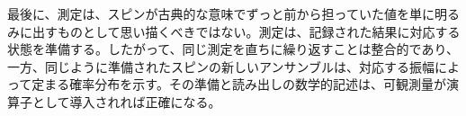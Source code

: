 \begin{classroomqa}
\end{classroomqa}

最後に、測定は、スピンが古典的な意味でずっと前から担っていた値を単に明るみに出すものとして思い描くべきではない。測定は、記録された結果に対応する状態を準備する。したがって、同じ測定を直ちに繰り返すことは整合的であり、一方、同じように準備されたスピンの新しいアンサンブルは、対応する振幅によって定まる確率分布を示す。その準備と読み出しの数学的記述は、可観測量が演算子として導入されれば正確になる。